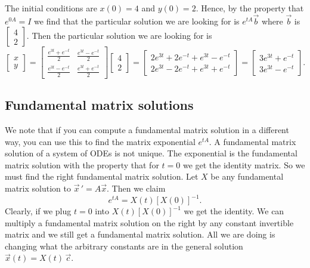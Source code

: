 \documentclass[12pt]{book}
\begin{document}
\begin{example}
The initial conditions are $x(0) = 4$ and $y(0) = 2$.  Hence, by the property
that $e^{0A} = I$ we find that the particular solution we are looking for
is $e^{tA} \vec{b}$ where $\vec{b}$ is $\left[
\begin{smallmatrix} 4 \\ 2 \end{smallmatrix} \right]$.
Then the particular solution we are looking for is
\begin{equation*}
\begin{bmatrix}
x \\ y
\end{bmatrix}
=
\begin{bmatrix}
\frac{e^{3t}+e^{-t}}{2} & \frac{e^{3t}-e^{-t}}{2} \\
\frac{e^{3t}-e^{-t}}{2} & \frac{e^{3t}+e^{-t}}{2}
\end{bmatrix}
\begin{bmatrix}
4 \\ 2
\end{bmatrix}
=
\begin{bmatrix}
2e^{3t}+2e^{-t} + e^{3t}-e^{-t} \\
2e^{3t}-2e^{-t} + e^{3t}+e^{-t}
\end{bmatrix}
=
\begin{bmatrix}
3e^{3t}+e^{-t} \\
3e^{3t}-e^{-t}
\end{bmatrix} .
\end{equation*}
\end{example}

\subsection{Fundamental matrix solutions}

We note that if you can compute a fundamental matrix solution
in a different way, you can use this to find the matrix exponential $e^{tA}$.
A fundamental matrix solution of a system of ODEs is not unique.  The
exponential is the fundamental matrix solution with the property that
for $t=0$ we get the identity matrix.  So we
must find the right fundamental matrix solution.  Let $X$ be any fundamental
matrix solution to ${\vec{x}\,}' = A \vec{x}$.  Then we claim
\begin{equation*}
e^{tA} = X(t) \left[ X(0) \right]^{-1} .
\end{equation*}
Clearly, if we plug $t=0$ into 
$X(t) \left[ X(0) \right]^{-1}$ we get the identity.  
We can multiply a fundamental matrix solution on the right by any
constant invertible matrix and we still get a fundamental matrix solution.
All we are doing is changing what the arbitrary constants are in the general
solution $\vec{x}(t) = X(t)\, \vec{c}$.
\end{document}
